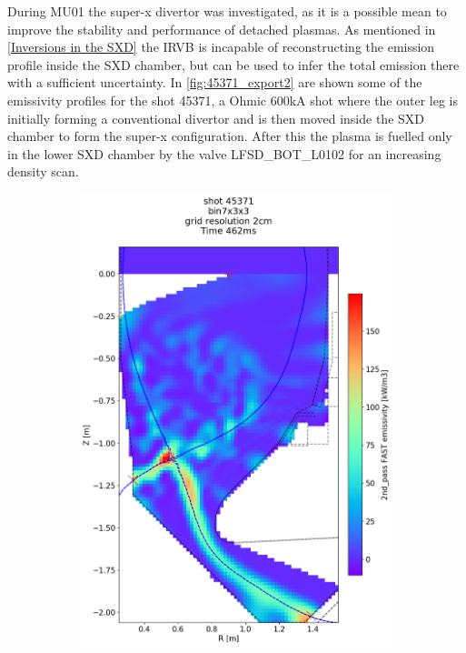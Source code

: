 During MU01 the super-x divertor was investigated, as it is a possible mean to improve the stability and performance of detached plasmas. As mentioned in \autoref{Inversions in the SXD} the IRVB is incapable of reconstructing the emission profile inside the SXD chamber, but can be used to infer the total emission there with a sufficient uncertainty. In \autoref{fig:45371_export2} are shown some of the emissivity profiles for the shot 45371, a Ohmic 600kA shot where the outer leg is initially forming a conventional divertor and is then moved inside the SXD chamber to form the super-x configuration. After this the plasma is fuelled only in the lower SXD chamber by the valve LFSD\_BOT\_L0102 for an increasing density scan.
\begin{figure}
     \centering
     \begin{subfigure}{0.395\linewidth}
         \centering
         \includegraphics[trim={75 40 0 190},clip,width=\textwidth]{Chapters/chapter2/figs/IRVB-MASTU_shot-45371_export_7.png}

\end{subfigure}
\end{figure}
